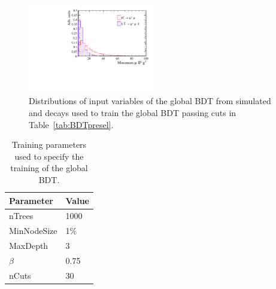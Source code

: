 \begin{figure}[htbp]
 \includegraphics[width=0.49\textwidth]{./Figs/Selection/Min_IP_Mar.pdf}

    \caption{Distributions of input variables of the global BDT from simulated \bsmumu and \bbbarmumux decays used to train the global BDT passing cuts in Table~\ref{tab:BDTpresel}.}
    \label{fig:BDTvars}
\end{figure}


\begin{table}[htbp]
\begin{center}
\begin{tabular}{ll}
\hline
Parameter & Value \\ \hline
nTrees & 1000 \\
MinNodeSize & 1$\%$ \\
MaxDepth & 3 \\
$\beta$ & 0.75 \\
nCuts & 30 \\
\hline
\end{tabular}
\vspace{0.7cm}
\caption{Training parameters used to specify the training of the global BDT.}
\label{tab:BDTtrainingparams}
\end{center}
\vspace{-1.0cm}
\end{table}



